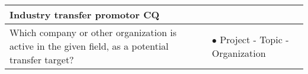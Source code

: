\begin{table}[]
\begin{tabular}{|p{6cm}|p{6cm}|}
\multicolumn{2}{|l|}{\textbf{Industry transfer promotor CQ}}                                                                                                                                                                                                                                           \\ \hline
Which company or other organization is active in the given field, as a potential transfer target?                                                     & $\bullet$ Project - Topic - Organization                                                                                                                 \\ \hline

\end{tabular}
\end{table}